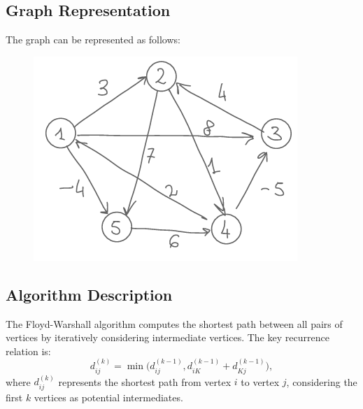 \subsection{Graph Representation}
The graph can be represented as follows:

\begin{figure}
    \centering
    \includegraphics[width=0.75\linewidth]{immagini//capitolo 14 esercizio/14_grafo.png}
\end{figure}

\subsection{Algorithm Description}
The Floyd-Warshall algorithm computes the shortest path between all pairs of vertices by iteratively considering intermediate vertices. The key recurrence relation is:
\[
d^{(k)}_{ij} = \min\big(d^{(k-1)}_{ij}, d^{(k-1)}_{iK} + d^{(k-1)}_{Kj}\big),
\]
where \( d^{(k)}_{ij} \) represents the shortest path from vertex \( i \) to vertex \( j \), considering the first \( k \) vertices as potential intermediates.

